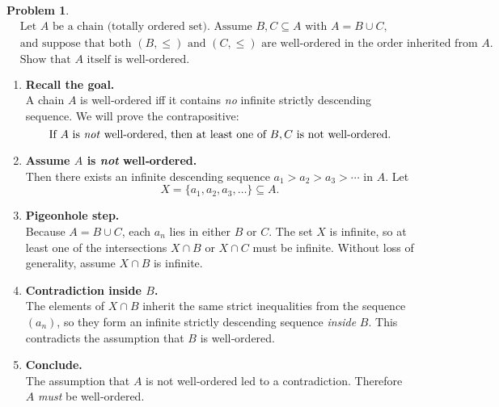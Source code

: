 \documentclass[12pt]{article}
\theoremstyle{definition} %
\newtheorem{problem}{Problem}
\theoremstyle{plain} %
\begin{document}
\begin{problem}
    \begin{align}
        &\text{Let } A \text{ be a chain (totally ordered set).  Assume }  
          B,C\subseteq A \text{ with } A=B\cup C, \\[-2pt]
        &\text{and suppose that both } (B,\le) \text{ and } (C,\le)
          \text{ are well‑ordered in the order inherited from } A.\\[4pt]
        &\text{Show that } A \text{ itself is well‑ordered.}
    \end{align}

    \begin{enumerate}
        \item \textbf{Recall the goal.}\\
              A chain \(A\) is well‑ordered iff it contains \emph{no}
              infinite strictly descending sequence.  We will prove the
              contrapositive:  
              \[
                 \text{If } A \text{ is \emph{not} well‑ordered, then at
                 least one of } B,C \text{ is not well‑ordered.}
              \]

        \item \textbf{Assume \(A\) is \emph{not} well‑ordered.}\\
              Then there exists an infinite descending sequence
              \(
                  a_{1}>a_{2}>a_{3}>\dotsb
              \)
              in \(A\).  
              Let
              \[
                  X=\{a_{1},a_{2},a_{3},\dotsc\}\subseteq A.
              \]

        \item \textbf{Pigeonhole step.}\\
              Because \(A=B\cup C\), each \(a_{n}\) lies in either \(B\)
              or \(C\).  
              The set \(X\) is infinite, so at least one of the intersections
              \(X\cap B\) or \(X\cap C\) must be infinite.  
              Without loss of generality, assume
              \(
                  X\cap B
              \)
              is infinite.

        \item \textbf{Contradiction inside \(B\).}\\
              The elements of \(X\cap B\) inherit the same strict
              inequalities from the sequence \((a_{n})\), so they form an
              infinite strictly descending sequence \emph{inside} \(B\).  
              This contradicts the assumption that \(B\) is well‑ordered.

        \item \textbf{Conclude.}\\
              The assumption that \(A\) is not well‑ordered led to a
              contradiction.  
              Therefore \(A\) \emph{must} be well‑ordered.
              \qedhere
    \end{enumerate}
\end{problem}
\end{document}
